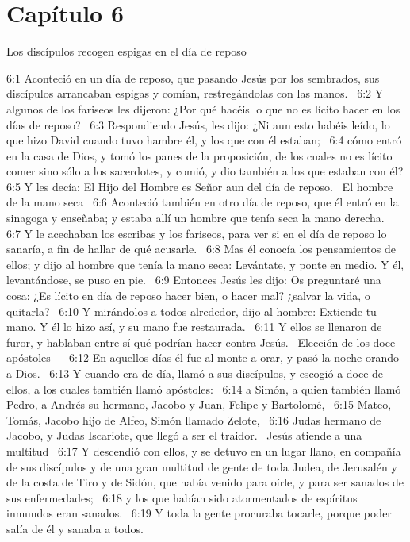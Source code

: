 \section*{Capítulo 6}
Los discípulos recogen espigas en el día de reposo   

6:1 Aconteció en un día de reposo, que pasando Jesús por los sembrados, sus discípulos arrancaban espigas y comían, restregándolas con las manos.  
6:2 Y algunos de los fariseos les dijeron: ¿Por qué hacéis lo que no es lícito hacer en los días de reposo?  
6:3 Respondiendo Jesús, les dijo: ¿Ni aun esto habéis leído, lo que hizo David cuando tuvo hambre él, y los que con él estaban;  
6:4 cómo entró en la casa de Dios, y tomó los panes de la proposición, de los cuales no es lícito comer sino sólo a los sacerdotes, y comió, y dio también a los que estaban con él? 
6:5 Y les decía: El Hijo del Hombre es Señor aun del día de reposo.  
El hombre de la mano seca   
6:6 Aconteció también en otro día de reposo, que él entró en la sinagoga y enseñaba; y estaba allí un hombre que tenía seca la mano derecha.  
6:7 Y le acechaban los escribas y los fariseos, para ver si en el día de reposo lo sanaría, a fin de hallar de qué acusarle.  
6:8 Mas él conocía los pensamientos de ellos; y dijo al hombre que tenía la mano seca: Levántate, y ponte en medio. Y él, levantándose, se puso en pie.  
6:9 Entonces Jesús les dijo: Os preguntaré una cosa: ¿Es lícito en día de reposo hacer bien, o hacer mal? ¿salvar la vida, o quitarla?  
6:10 Y mirándolos a todos alrededor, dijo al hombre: Extiende tu mano. Y él lo hizo así, y su mano fue restaurada.  
6:11 Y ellos se llenaron de furor, y hablaban entre sí qué podrían hacer contra Jesús.  
Elección de los doce apóstoles    
6:12 En aquellos días él fue al monte a orar, y pasó la noche orando a Dios.  
6:13 Y cuando era de día, llamó a sus discípulos, y escogió a doce de ellos, a los cuales también llamó apóstoles:  
6:14 a Simón, a quien también llamó Pedro, a Andrés su hermano, Jacobo y Juan, Felipe y Bartolomé,  
6:15 Mateo, Tomás, Jacobo hijo de Alfeo, Simón llamado Zelote,  
6:16 Judas hermano de Jacobo, y Judas Iscariote, que llegó a ser el traidor.  
Jesús atiende a una multitud   
6:17 Y descendió con ellos, y se detuvo en un lugar llano, en compañía de sus discípulos y de una gran multitud de gente de toda Judea, de Jerusalén y de la costa de Tiro y de Sidón, que había venido para oírle, y para ser sanados de sus enfermedades;  
6:18 y los que habían sido atormentados de espíritus inmundos eran sanados.  
6:19 Y toda la gente procuraba tocarle, porque poder salía de él y sanaba a todos.  

